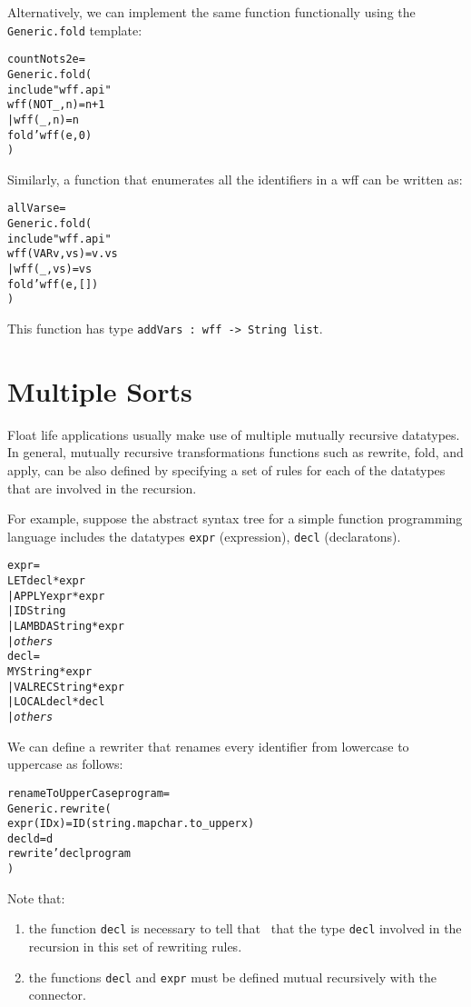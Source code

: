 Alternatively, we can implement the same function 
functionally using the \verb|Generic.fold| template:
\begin{alltt}
   \FUN countNots2 e = 
       Generic.fold(
       \LET include "wff.api"
           \FUN wff (NOT _, n) = n+1
             | wff (_, n) = n
       \IN  fold'wff(e, 0)
       \END)
\end{alltt}

Similarly, a function that enumerates all the identifiers in a wff
can be written as:
\begin{alltt}
   \FUN allVars e = 
       Generic.fold(
       \LET include "wff.api"
           \FUN wff (VAR v, vs) = v . vs
             | wff (_, vs) = vs
       \IN  fold'wff(e, [])
       \END)
\end{alltt}
This function has type \verb|addVars : wff -> String list|.

\section{Multiple Sorts}

   Float life applications usually make use of multiple
mutually recursive datatypes.  In general, mutually recursive
transformations functions such as rewrite, fold, and apply, can be also defined  
by specifying a set of rules for each of the datatypes that are involved
in the recursion.  

   For example, suppose the abstract syntax tree  
for a simple function programming language includes 
the datatypes \verb|expr| (expression), 
\verb|decl| (declaratons).

\begin{alltt}
  \DATATYPE expr = 
    LET \OF decl * expr
  | APPLY \OF expr * expr
  | ID \OF String
  | LAMBDA \OF String * expr
  | {\em others}
  \AND decl = 
    MY \OF String * expr
  | VALREC \OF String * expr
  | LOCAL \OF decl * decl
  | {\em others}
\end{alltt}

We can define a rewriter that renames every identifier 
from lowercase to uppercase as follows:
\begin{alltt}
   \FUN renameToUpperCase program =  
   Generic.rewrite(
        \FUN expr (ID x) = ID(string.map char.to_upper x)
        \AND decl d      = d
   \IN  rewrite'decl program
   \END
   )
\end{alltt}

Note that:
\begin{enumerate}
  \item the function \verb|decl| is necessary to tell that 
\RewriteGen\ that the type \verb|decl| involved in the recursion
in this set of rewriting rules.
  \item the functions \verb|decl| and \verb|expr| must be defined 
        mutual recursively with the \AND{} connector.
\end{enumerate}

